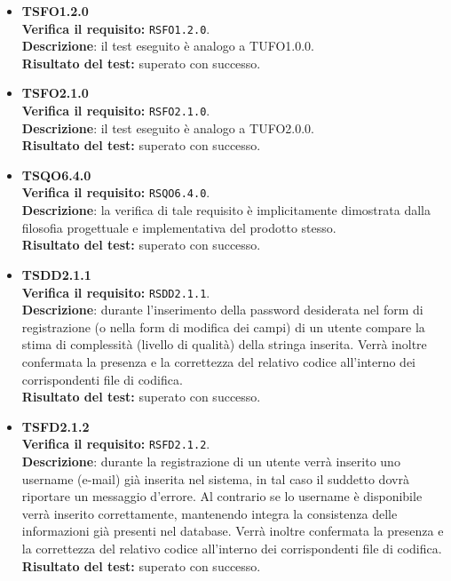 \begin{itemize}
\item \textbf{TSFO1.2.0}\\
\textbf{Verifica il requisito:} \texttt{RSFO1.2.0}.\\
\textbf{Descrizione}: il test eseguito è analogo a TUFO1.0.0.\\
\textbf{Risultato del test:} superato con successo.

\item \textbf{TSFO2.1.0}\\
\textbf{Verifica il requisito:} \texttt{RSFO2.1.0}.\\
\textbf{Descrizione}: il test eseguito è analogo a TUFO2.0.0.\\
\textbf{Risultato del test:} superato con successo.

\item \textbf{TSQO6.4.0}\\
\textbf{Verifica il requisito:} \texttt{RSQO6.4.0}.\\
\textbf{Descrizione}: la verifica di tale requisito è implicitamente dimostrata dalla filosofia progettuale e implementativa del prodotto stesso.\\
\textbf{Risultato del test:} superato con successo.

\item \textbf{TSDD2.1.1}\\
\textbf{Verifica il requisito:} \texttt{RSDD2.1.1}.\\
\textbf{Descrizione}: durante l'inserimento della password desiderata nel form di registrazione (o nella form di modifica dei campi) di un utente  compare la stima di complessità (livello di qualità) della stringa inserita. Verrà inoltre confermata la presenza e la correttezza  del relativo codice all'interno dei corrispondenti file di codifica.\\
\textbf{Risultato del test:} superato con successo.

\item \textbf{TSFD2.1.2}\\
\textbf{Verifica il requisito:} \texttt{RSFD2.1.2}.\\
\textbf{Descrizione}: durante la registrazione di un utente  verrà inserito uno username (e-mail) già inserita nel sistema, in tal caso il suddetto dovrà riportare un messaggio d'errore. Al contrario se lo username è disponibile verrà inserito correttamente, mantenendo integra la consistenza delle informazioni già presenti nel database. Verrà inoltre confermata la presenza e la correttezza  del relativo codice all'interno dei corrispondenti file di codifica.\\
\textbf{Risultato del test:} superato con successo.


\end{itemize}
